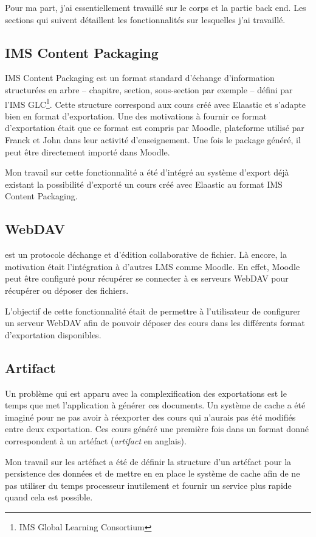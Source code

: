 Pour ma part, j'ai essentiellement travaillé sur le corps et la partie back end.
Les sections qui suivent détaillent les fonctionnalités sur lesquelles j'ai
travaillé.

\subsection{IMS Content Packaging}
IMS Content Packaging est un format standard d'échange d'information structurées
en arbre -- chapitre, section, sous-section par exemple -- défini par l'IMS
GLC\footnote{IMS Global Learning Consortium}. Cette structure correspond aux
cours créé avec Elaastic et s'adapte bien en format d'exportation. Une des
motivations à fournir ce format d'exportation était que ce format est compris
par Moodle, plateforme utilisé par Franck et John dans leur activité
d'enseignement. Une fois le package généré, il peut être directement importé
dans Moodle.

Mon travail sur cette fonctionnalité a été d'intégré au système d'export déjà
existant la possibilité d'exporté un cours créé avec Elaastic au format IMS
Content Packaging.

\subsection{WebDAV}
 est un protocole déchange et d'édition collaborative de fichier.
Là encore, la motivation était l'intégration à d'autres LMS comme Moodle. En
effet, Moodle peut être configuré pour récupérer se connecter à es serveurs
WebDAV pour récupérer ou déposer des fichiers.

L'objectif de cette fonctionnalité était de permettre à l'utilisateur de
configurer un serveur WebDAV afin de pouvoir déposer des cours dans les
différents format d'exportation disponibles.

\subsection{Artifact}
Un problème qui est apparu avec la complexification des exportations est le
temps que met l'application à générer ces documents. Un système de cache a été
imaginé pour ne pas avoir à réexporter des cours qui n'aurais pas été modifiés
entre deux exportation. Ces cours généré une première fois dans un format donné
correspondent à un artéfact ({\em artifact} en anglais).

Mon travail sur les artéfact a été de définir la structure d'un artéfact pour la
persistence des données et de mettre en en place le système de cache afin de ne
pas utiliser du temps processeur inutilement et fournir un service plus rapide
quand cela est possible.

